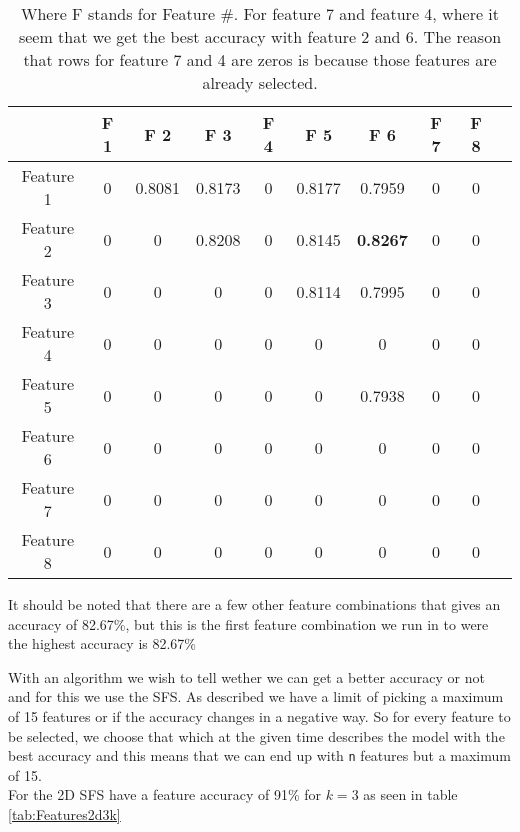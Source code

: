 \begin{table}[H]
  \centering
    \begin{tabular}{|c|c|c|c|c|c|c|c|c|c|}
    \hline
               &F 1 &F 2 &F 3 &F 4 &F 5 &F 6 &F 7 &F 8   \\ \hline
             Feature 1&0 &   0.8081 &   0.8173 &        0 &   0.8177 &   0.7959 &        0 &        0 \\
             Feature 2&0 &        0 &   0.8208 &        0 &   0.8145 &   \textbf{0.8267} &        0 &        0 \\
             Feature 3&0 &        0 &        0 &        0 &   0.8114 &   0.7995 &        0 &        0 \\
             Feature 4&0 &        0 &        0 &        0 &        0 &        0 &        0 &        0 \\
             Feature 5&0 &        0 &        0 &        0 &        0 &   0.7938 &        0 &        0 \\
             Feature 6&0 &        0 &        0 &        0 &        0 &        0 &        0 &        0 \\
             Feature 7&0 &        0 &        0 &        0 &        0 &        0 &        0 &        0 \\
             Feature 8&0 &        0 &        0 &        0 &        0 &        0 &        0 &        0 \\ \hline
    \end{tabular}%
  \caption{Where F stands for Feature \#. For feature 7 and feature 4, where it seem that we get the best accuracy with feature 2 and 6. The reason that rows for feature 7 and 4 are zeros is because those features are already selected.}\label{tab:AccuracyTable}%
\end{table}%

It should be noted that there are a few other feature combinations that gives an accuracy of 82.67\%, but this is the first feature combination we run in to were the highest accuracy is 82.67\%

With an algorithm we wish to tell wether we can get a better accuracy or not and for this we use the SFS. As described we have a limit of picking a maximum of 15 features or if the accuracy changes in a negative way. So for every feature to be selected, we choose that which at the given time describes the model with the best accuracy and this means that we can end up with \texttt{n} features but a maximum of 15.\\
For the 2D SFS have a feature accuracy of 91\% for $k=3$ as seen in table \ref{tab:Features2d3k}

